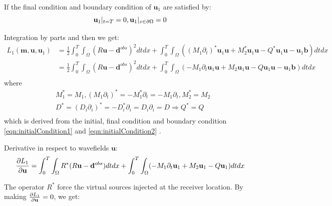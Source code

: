 \documentclass[pdftex,a4paper,parskip,listof=totoc,bibliography=totoc,onehalfspacing,12pt]{scrreprt}
\begin{document}
\par If the final condition and boundary condition of $\mathbf{u}_{1}$ are satisfied by:
\begin{equation}
\label{eqn:initialCondition2}
 \mathbf{u}_{1}|_{t=T} = 0, \mathbf{u}_{1}|_{x\in \partial \Omega} = 0\\
\end{equation}
\par Integration by parts and then we get:
\begin{equation}
\begin{split}
L_1(\mathbf{m}, \mathbf{u},\mathbf{u}_{1})
  & = \frac{1}{2} \int_0^T \int_\Omega (R\mathbf{u} - \mathbf{d}^{obs})^2 dt dx + \int_0^T \int_\Omega ((M_1 \partial_{t})^* \mathbf{u}_{1} \mathbf{u} + M_2^* \mathbf{u}_{1} \mathbf{u} - Q^* \mathbf{u}_{1} \mathbf{u} - \mathbf{u}_{1} \mathbf{b})  dt dx \\
  & = \frac{1}{2} \int_0^T \int_\Omega (R\mathbf{u} - \mathbf{d}^{obs})^2 dt dx + \int_0^T \int_\Omega (-M_1 \partial_{t} \mathbf{u}_{1} \mathbf{u} + M_2 \mathbf{u}_{1} \mathbf{u} - Q \mathbf{u}_{1} \mathbf{u} - \mathbf{u}_{1} \mathbf{b})  dt dx\\
 \end{split}
\end{equation}
where 
\begin{equation}
\begin{split}
& M_1^{*} =  M_1, (M_1 \partial_{t}) ^{*} = -M_1^{*} \partial_{t} = -M_1 \partial_{t}, M_2^{*} =  M_2\\
& D^{*} = (D_i \partial_{i})^{*} = -D_i^{*} \partial_{i} = D_i \partial_{i} = D \Rightarrow Q^{*} = Q\\
 \end{split}
\end{equation}
which is derived from the initial, final condition and boundary condition \ref{eqn:initialCondition1} and \ref{eqn:initialCondition2} \citep{yang2016review}.\\
\par Derivative in respect to wavefields $\mathbf{u}$:
\begin{equation}
 \pdv{L_1}{\mathbf{u}} = \int_0^T \int_\Omega R^{*}(R\mathbf{u} - \mathbf{d}^{obs}) dt dx + \int_0^T \int_\Omega (-M_1 \partial_{t} \mathbf{u}_{1}  + M_2 \mathbf{u}_{1} - Q \mathbf{u}_{1})  dt dx\\
\end{equation}
\par The operator $R^{*}$ force the virtual sources injected at the receiver location. By making $\pdv{L_1}{\mathbf{u}} = 0$, we get:
\end{document}
